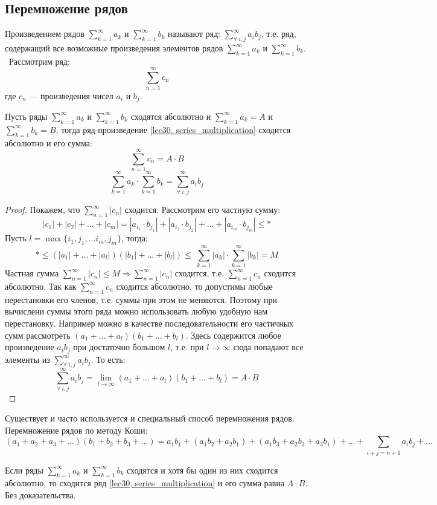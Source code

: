 \documentclass[../../main.tex]{subfiles}
\begin{document}
\subsection{Перемножение рядов}
Произведением рядов $\sum\limits_{k = 1}^{\infty} a_k$ и
$\sum\limits_{k = 1}^{\infty} b_k$ называют ряд:
$\sum\limits_{\forall \ i,j}^{\infty} a_i b_j$, т.е. ряд, содержащий все
возможные произведения элементов рядов $\sum\limits_{k = 1}^{\infty} a_k$ и
$\sum\limits_{k = 1}^{\infty} b_k$. \ Рассмотрим ряд:
\begin{equation}
	\label{lec30, series_multiplication}
	\sum\limits_{n = 1}^{\infty} c_n
\end{equation}
где $c_n$ --- произведения чисел $a_i$ и $b_j$.
\begin{thm}
	Пусть ряды $\sum\limits_{k = 1}^{\infty} a_k$ и
	$\sum\limits_{k = 1}^{\infty} b_k$ сходятся абсолютно и
	$\sum\limits_{k = 1}^{\infty} a_k = A$ и
	$\sum\limits_{k = 1}^{\infty} b_k = B$, тогда ряд-произведение
	\eqref{lec30, series_multiplication} сходится абсолютно и его сумма:
	\[\sum\limits_{n = 1}^{\infty} c_n = A \cdot B \]
	\[\sum\limits_{k = 1}^{\infty} a_k \cdot
	\sum\limits_{k = 1}^{\infty} b_k =
	\sum\limits_{\forall \ i,j}^{\infty} a_i b_j\]
\end{thm}
\begin{proof}
Покажем, что $\sum\limits_{n = 1}^{\infty} |c_n|$ сходится. Рассмотрим
его частную сумму:
\[|c_1| + |c_2| + \ldots + |c_m| = |a_{i_1} \cdot b_{j_1}| +
|a_{i_2} \cdot b_{j_2}| + \ldots + |a_{i_m} \cdot b_{j_m}| \leq \ast\]
Пусть $l = \max\{i_1, j_1, \ldots i_m, j_m\}$, тогда:
\[\ast \leq (|a_1| + \ldots + |a_l|)(|b_1| + \ldots + |b_l|)
\leq\ \sum\limits_{k = 1}^{\infty} |a_k| \cdot
\sum\limits_{k = 1}^{\infty} |b_k| = M\]
Частная сумма $\sum\limits_{n = 1}^{\infty} |c_n| \leq M \Longrightarrow
\sum\limits_{n = 1}^{\infty} |c_n|$ сходится, т.е.
$\sum\limits_{n = 1}^{\infty} c_n$ сходится абсолютно.
Так как $\sum\limits_{n = 1}^{\infty} c_n$ сходится абсолютно, то допустимы
любые перестановки его членов, т.е. суммы при этом не меняются. Поэтому при
вычислени суммы этого ряда можно использовать любую удобную нам
перестановку. Например можно в качестве последовательности его частичных
сумм рассмотреть $(a_1 + \ldots + a_l)(b_1 + \ldots + b_l)$. Здесь
содержится любое произведение $a_i b_j$ при достаточно большом $l$, т.е.
при $l \to \infty$ сюда попадают все элементы из
$\sum\limits_{\forall \ i,j}^{\infty} a_i b_j$. То есть:
\[\sum\limits_{\forall \ i,j}^{\infty} a_i b_j =
\lim\limits_{l \to \infty} (a_1 + \ldots + a_l)(b_1 + \ldots + b_l) = A \cdot B\]
\end{proof}
Существует и часто используется и специальный способ перемножения рядов.
Перемножение рядов по методу Коши:
\[(a_1 + a_2 + a_3 + \ldots)(b_1 + b_2 + b_3 + \ldots) = a_1 b_1 +
(a_1 b_2 + a_2 b_1) + (a_1 b_3 + a_2 b_2 + a_3 b_1) + \ldots +
\sum\limits_{i + j = n + 1} a_i b_j + \ldots\]
\begin{thm}
Если ряды $\sum\limits_{k = 1}^{\infty} a_k$ и
$\sum\limits_{k = 1}^{\infty} b_k$ сходятся и хотя бы один из них
сходится абсолютно, то сходится ряд \eqref{lec30, series_multiplication}
и его сумма равна $A \cdot B$. Без доказательства.
\end{thm}
\end{document}
